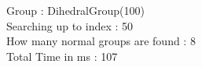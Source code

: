 Group : DihedralGroup(100)\\
Searching up to index : 50\\
How many normal groups are found : 8\\
Total Time in ms : 107\\
